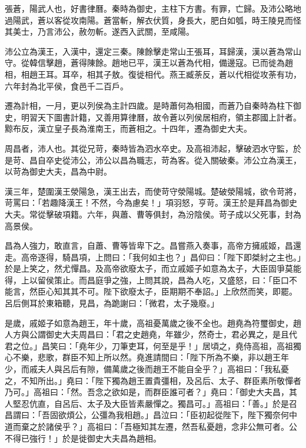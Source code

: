 
\begin{pinyinscope}
張蒼，陽武人也，好書律曆。秦時為御史，主柱下方書。有罪，亡歸。及沛公略地過陽武，蒼以客從攻南陽。蒼當斬，解衣伏質，身長大，肥白如瓠，時王陵見而怪其美士，乃言沛公，赦勿斬。遂西入武關，至咸陽。

沛公立為漢王，入漢中，還定三秦。陳餘擊走常山王張耳，耳歸漢，漢以蒼為常山守。從韓信擊趙，蒼得陳餘。趙地已平，漢王以蒼為代相，備邊寇。已而徙為趙相，相趙王耳。耳卒，相其子敖。復徙相代。燕王臧荼反，蒼以代相從攻荼有功，六年封為北平侯，食邑千二百戶。

遷為計相，一月，更以列侯為主計四歲。是時蕭何為相國，而蒼乃自秦時為柱下御史，明習天下圖書計籍，又善用算律曆，故令蒼以列侯居相府，領主郡國上計者。黥布反，漢立皇子長為淮南王，而蒼相之。十四年，遷為御史大夫。

周昌者，沛人也。其從兄苛，秦時皆為泗水卒史。及高祖沛起，擊破泗水守監，於是苛、昌自卒史從沛公，沛公以昌為職志，苛為客。從入關破秦。沛公立為漢王，以苛為御史大夫，昌為中尉。

漢三年，楚圍漢王滎陽急，漢王出去，而使苛守滎陽城。楚破滎陽城，欲令苛將，苛罵曰：「若趣降漢王！不然，今為慮矣！」項羽怒，亨苛。漢王於是拜昌為御史大夫。常從擊破項籍。六年，與蕭、曹等俱封，為汾陰侯。苛子成以父死事，封為高景侯。

昌為人強力，敢直言，自蕭、曹等皆卑下之。昌嘗燕入奏事，高帝方擁戚姬，昌還走。高帝逐得，騎昌項，上問曰：「我何如主也？」昌仰曰：「陛下即桀紂之主也。」於是上笑之，然尤憚昌。及高帝欲廢太子，而立戚姬子如意為太子，大臣固爭莫能得，上以留侯策止。而昌庭爭之強，上問其說，昌為人吃，又盛怒，曰：「臣口不能言，然臣心知其其不可。陛下欲廢太子，臣期期不奉詔。」上欣然而笑，即罷。呂后側耳於東箱聽，見昌，為跪謝曰：「微君，太子幾廢。」

是歲，戚姬子如意為趙王，年十歲，高祖憂萬歲之後不全也。趙堯為符璽御史，趙人方與公謂御史大夫周昌曰：「君之史趙堯，年雖少，然奇士，君必異之，是且代君之位。」昌笑曰：「堯年少，刀筆吏耳，何至是乎！」居頃之，堯侍高祖，高祖獨心不樂，悲歌，群臣不知上所以然。堯進請間曰：「陛下所為不樂，非以趙王年少，而戚夫人與呂后有隙，備萬歲之後而趙王不能自全乎？」高祖曰：「我私憂之，不知所出。」堯曰：「陛下獨為趙王置貴彊相，及呂后、太子、群臣素所敬憚者乃可。」高祖曰：「然。吾念之欲如是，而群臣誰可者？」堯曰：「御史大夫昌，其人堅忍伉直，自呂后、太子及大臣皆素嚴憚之。獨昌可。」高祖曰：「善。」於是召昌謂曰：「吾固欲煩公，公彊為我相趙。」昌泣曰：「臣初起從陛下，陛下獨奈何中道而棄之於諸侯乎？」高祖曰：「吾極知其左遷，然吾私憂趙，念非公無可者。公不得已強行！」於是徙御史大夫昌為趙相。


\end{pinyinscope}
